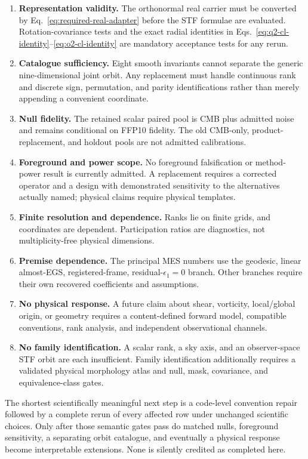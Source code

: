 \documentclass[11pt,a4paper]{article}
\begin{document}
\begin{enumerate}[leftmargin=*]
  \item \textbf{Representation validity.}  The orthonormal real carrier must
  be converted by Eq.~\eqref{eq:required-real-adapter} before the STF formulae
  are evaluated.  Rotation-covariance tests and the exact radial identities
  in Eqs.~\eqref{eq:q2-cl-identity}--\eqref{eq:o2-cl-identity} are mandatory
  acceptance tests for any rerun.
  \item \textbf{Catalogue sufficiency.}  Eight smooth invariants cannot
  separate the generic nine-dimensional joint orbit.  Any replacement must
  handle continuous rank and discrete sign, permutation, and parity
  identifications rather than merely appending a convenient coordinate.
  \item \textbf{Null fidelity.}  The retained scalar paired pool is CMB plus
  admitted noise and remains conditional on FFP10 fidelity.  The old CMB-only,
  product-replacement, and holdout pools are not admitted calibrations.
  \item \textbf{Foreground and power scope.}  No foreground falsification or
  method-power result is currently admitted.  A replacement requires a
  corrected operator and a design with demonstrated sensitivity to the
  alternatives actually named; physical claims require physical templates.
  \item \textbf{Finite resolution and dependence.}  Ranks lie on finite grids,
  and coordinates are dependent.  Participation ratios are diagnostics, not
  multiplicity-free physical dimensions.
  \item \textbf{Premise dependence.}  The principal MES numbers use the
  geodesic, linear almost-EGS, registered-frame, residual-$\epsilon_1=0$
  branch.  Other branches require their own recovered coefficients and
  assumptions.
  \item \textbf{No physical response.}  A future claim about shear,
  vorticity, local/global origin, or geometry requires a content-defined
  forward model, compatible conventions, rank analysis, and independent
  observational channels.
  \item \textbf{No family identification.}  A scalar rank, a sky axis, and an
  observer-space STF orbit are each insufficient.  Family identification
  additionally requires a validated physical morphology atlas and null,
  mask, covariance, and equivalence-class gates.
\end{enumerate}

The shortest scientifically meaningful next step is a code-level convention
repair followed by a complete rerun of every affected row under unchanged
scientific choices.  Only after those semantic gates pass do matched nulls,
foreground sensitivity, a separating orbit catalogue, and eventually a
physical response become interpretable extensions.  None is silently credited
as completed here.
\end{document}
